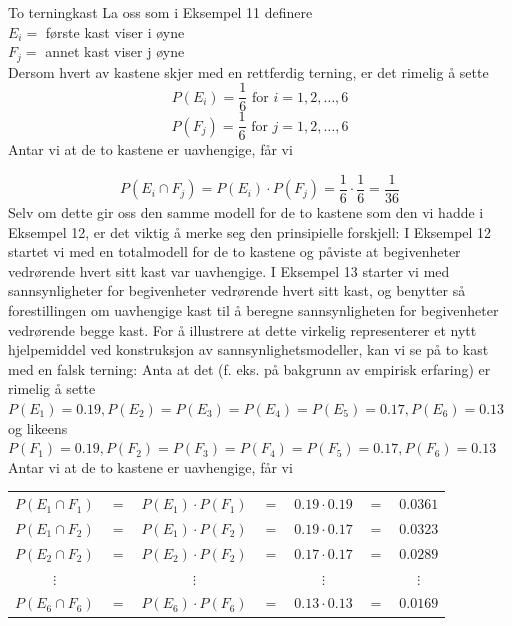\begin{eksempel}{To terningkast}
La oss som i Eksempel 11 definere \\[3mm]
\indent     $E_i =$ første kast viser i øyne \\
\indent     $F_j =$ annet kast viser j øyne \\[3mm]
Dersom hvert av kastene skjer med en rettferdig terning, er det
rimelig å sette
\[ P(E_i)=\frac{1}{6} \mbox{\ \  for \ \ } i=1,2, \ldots,6 \]
\[ P(F_j)=\frac{1}{6} \mbox{\ \  for \ \ } j=1,2, \ldots,6 \]
Antar vi at de to kastene er uavhengige, får vi

\[ P(E_i \cap F_j)=P(E_i) \cdot P(F_j)=\frac{1}{6} \cdot \frac{1}{6}
                             =\frac{1}{36} \]
Selv om dette gir oss den samme modell for de to kastene som den
vi hadde i Eksempel 12, er det viktig å merke seg den
prinsipielle forskjell: I Eksempel 12 startet vi med en
totalmodell for de to kastene og påviste at begivenheter
vedrørende hvert sitt kast var uavhengige. I Eksempel 13 starter
vi med sannsynligheter for begivenheter vedrørende hvert sitt
kast, og benytter så forestillingen om uavhengige kast til å
beregne sannsynligheten for begivenheter vedrørende begge kast.
For å illustrere at dette virkelig representerer et nytt
hjelpemiddel ved konstruksjon av sannsynlighetsmodeller, kan vi
se på to kast med en falsk terning: Anta at det (f. eks. på
bakgrunn av empirisk erfaring) er rimelig å sette \\

$P(E_1)=0.19,P(E_2)=P(E_3)=P(E_4)=P(E_5)=0.17,P(E_6)=0.13$ \\

\noindent og likeens \\

$P(F_1)=0.19,P(F_2)=P(F_3)=P(F_4)=P(F_5)=0.17,P(F_6)=0.13$ \\

\noindent Antar vi at de to kastene er uavhengige, får vi

\begin{tabular}{ccccccc}
 $P(E_1\cap F_1)$&$=$&$P(E_1)\cdot P(F_1)$&$=$&$0.19\cdot 0.19$&$=$&$0.0361$ \\
 $P(E_1\cap F_2)$&$=$&$P(E_1)\cdot P(F_2)$&$=$&$0.19\cdot 0.17$&$=$&$0.0323$ \\
 $P(E_2\cap F_2)$&$=$&$P(E_2)\cdot P(F_2)$&$=$&$0.17\cdot 0.17$&$=$&$0.0289$ \\
     $\vdots$     &   &   $\vdots$         &   &      $\vdots$   &   & $\vdots$ \\
 $P(E_6\cap F_6)$&$=$&$P(E_6)\cdot P(F_6)$&$=$&$0.13\cdot 0.13$&$=$&$0.0169$
\end{tabular}
\end{eksempel}

